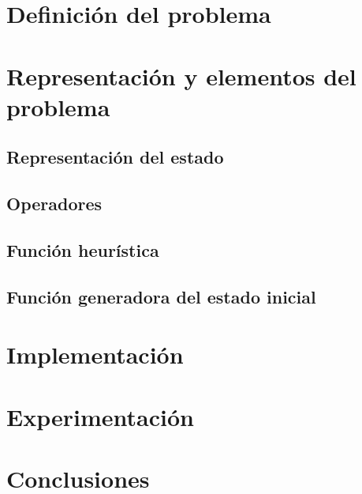 \documentclass[10pt]{article}
\begin{document}
\newpage
\section{Definición del problema}

\newpage
\section{Representación y elementos del problema}
\subsection{Representación del estado}
\subsection{Operadores}
\subsection{Función heurística}
\subsection{Función generadora del estado inicial}

\newpage
\section{Implementación}

\newpage
\section{Experimentación}

\newpage
\section{Conclusiones}
\end{document}
